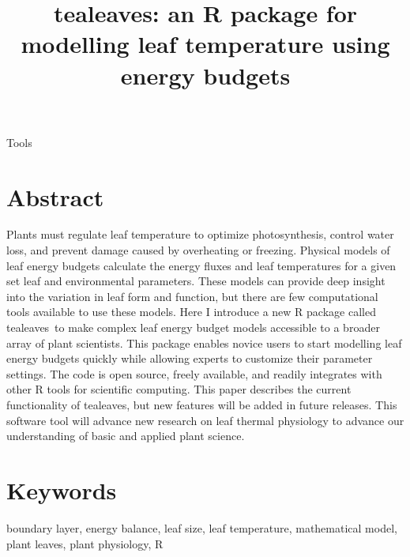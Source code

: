 \documentclass[11pt, oneside]{article}
\newcommand{\pkg}[1]{{\fontseries{b}\selectfont #1}}
\newcommand{\tealeaves}{\pkg{tealeaves}}
\begin{document}
\title{\tealeaves: an R package for modelling leaf temperature using energy budgets}
\author{}
\date{} %

\begin{center}
Tools 
\end{center}

{\let\newpage\relax\maketitle}


\section*{Abstract}

Plants must regulate leaf temperature to optimize photosynthesis, control water loss, and prevent damage caused by overheating or freezing. Physical models of leaf energy budgets calculate the energy fluxes and leaf temperatures for a given set leaf and environmental parameters. These models can provide deep insight into the variation in leaf form and function, but there are few computational tools available to use these models. Here I introduce a new R package called \tealeaves~to make complex leaf energy budget models accessible to a broader array of plant scientists. This package enables novice users to start modelling leaf energy budgets quickly while allowing experts to customize their parameter settings. The code is open source, freely available, and readily integrates with other R tools for scientific computing. This paper describes the current functionality of \tealeaves, but new features will be added in future releases. This software tool will advance new research on leaf thermal physiology to advance our understanding of basic and applied plant science.

\section*{Keywords}

boundary layer, energy balance, leaf size, leaf temperature, mathematical model, plant leaves, plant physiology, R
\end{document}
